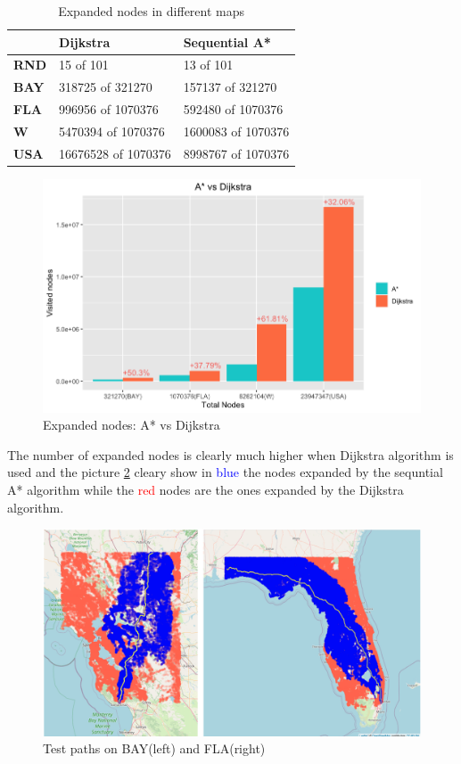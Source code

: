 \documentclass[twocolumn, switch]{article} %
\begin{document}
\begin{table}[ht!]
  \caption{Expanded nodes in different maps}
  \begin{tabular}{|l|l|l|}
  \hline
  \textbf{} & \textbf{Dijkstra} & \textbf{Sequential A*}       \\ \hline
  \textbf{RND}            & 15 of 101           & 13 of 101         \\ \hline
  \textbf{BAY}            & 318725 of 321270    & 157137 of 321270  \\ \hline
  \textbf{FLA}            & 996956 of 1070376   & 592480 of 1070376 \\ \hline
  \textbf{W}              & 5470394 of 1070376  & 1600083 of 1070376 \\ \hline
  \textbf{USA}            & 16676528 of 1070376 & 8998767 of 1070376 \\ \hline
  \end{tabular}
\end{table}
\begin{figure}[ht!]
  \centering
  \includegraphics[width=1\linewidth]{astar_dijkstra/expanded_nodes.png}
  \caption{Expanded nodes: A* vs Dijkstra}
  \label{histogramnodes}
\end{figure}
The number of expanded nodes is clearly much higher when Dijkstra algorithm is used and the picture
\ref{astardijkstramap} cleary show in \textcolor{blue}{blue} the nodes expanded by the sequntial A* algorithm
while the \textcolor{red}{red} nodes are the ones expanded by the Dijkstra algorithm.
\begin{figure}[ht!]
  \centering
  \includegraphics[width=1\linewidth]{astar_dijkstra/dijkstra_astar.png}
  \caption{Test paths on BAY(left) and FLA(right)}
  \label{astardijkstramap}
\end{figure}
\end{document}
